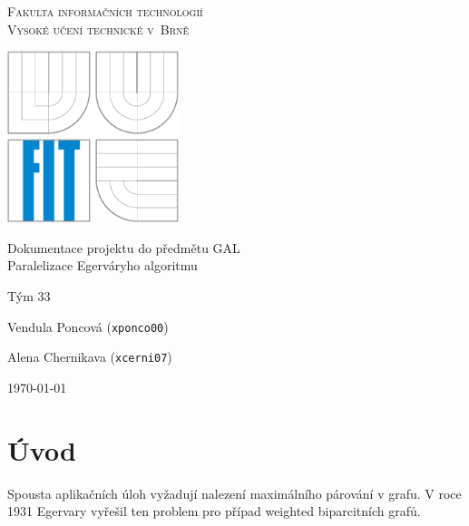 \documentclass[a4paper, 11pt, titlepage, final]{article}[3. prosinec 2011]
\begin{document}

\begin{titlepage}
\begin{center}

\textsc{
\Large Fakulta informačních technologií 
\medskip\\
Vysoké učení technické v~Brně}


{\parbox{5cm}{\centering\includegraphics[height=5cm]{img/logo.eps}}}


{\LARGE Dokumentace projektu do předmětu GAL} \medskip \\
{\Large Paralelizace Egerváryho algoritmu} 



\end{center}

{\large
Tým 33

Vendula Poncová (\texttt{xponco00})

Alena Chernikava (\texttt{xcerni07})
} \hfill {\large\today}

\end{titlepage}


\setcounter{page}{1}

\section{Úvod}

Spousta aplikačních úloh vyžadují nalezení maximálního párování v grafu. V roce 1931
Egervary vyřešil ten problem pro případ weighted biparcitních grafů.
\end{document}
